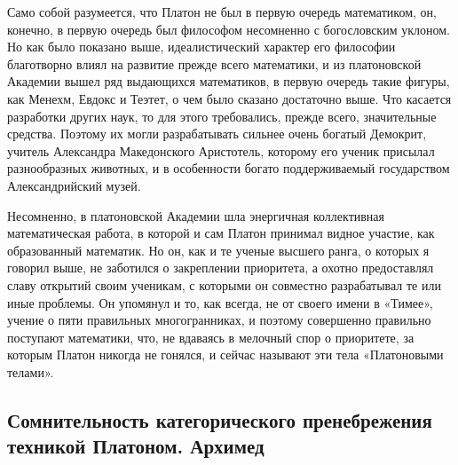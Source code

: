 Само собой разумеется, что Платон не был в первую очередь математиком,
он, конечно, в первую очередь  был философом несомненно с богословским
уклоном.  Но  как было  показано  выше,  идеалистический характер  его
философии благотворно влиял на развитие  прежде всего математики, и из
платоновской  Академии  вышел  ряд выдающихся  математиков,  в  первую
очередь такие фигуры, как Менехм, Евдокс  и Теэтет, о чем было сказано
достаточно выше.  Что касается  разработки других  наук, то  для этого
требовались,  прежде всего,  значительные средства.  Поэтому их  могли
разрабатывать  сильнее  очень  богатый  Демокрит,  учитель  Александра
Македонского  Аристотель, которому  его ученик  присылал разнообразных
животных,   и  в   особенности   богато  поддерживаемый   государством
Александрийский музей.

Несомненно,  в  платоновской   Академии  шла  энергичная  коллективная
математическая работа, в которой и сам Платон принимал видное участие,
как образованный  математик. Но он, как  и те ученые высшего  ранга, о
которых  я говорил  выше,  не заботился  о  закреплении приоритета,  а
охотно  предоставлял  славу открытий  своим  ученикам,  с которыми  он
совместно разрабатывал  те или  иные проблемы. Он  упомянул и  то, как
всегда,  не  от своего  имени  в  «Тимее»,  учение о  пяти  правильных
многогранниках, и  поэтому совершенно правильно  поступают математики,
что,  не вдаваясь  в мелочный  спор  о приоритете,  за которым  Платон
никогда не гонялся, и сейчас называют эти тела «Платоновыми телами».

\subsection{Сомнительность   категорического  пренебрежения   техникой
Платоном. Архимед}

